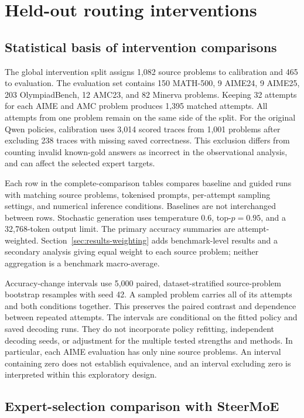\documentclass[12pt,a4paper,twoside,openright]{book}
\begin{document}
\section{Held-out routing interventions}
\label{sec:results-guiding}

\subsection{Statistical basis of intervention comparisons}

The global intervention split assigns 1,082 source problems to calibration
and 465 to evaluation. The evaluation set contains 150 MATH-500, 9 AIME24,
9 AIME25, 203 OlympiadBench, 12 AMC23, and 82 Minerva problems. Keeping
32 attempts for each AIME and AMC problem produces 1,395 matched attempts.
All attempts from one problem remain on the same side of the split.
For the original Qwen policies, calibration uses 3,014 scored traces from
1,001 problems after excluding 238 traces with missing saved correctness.
This exclusion differs from counting invalid known-gold answers as incorrect
in the observational analysis, and can affect the selected expert targets.

Each row in the complete-comparison tables compares baseline and guided runs with matching
source problems, tokenised prompts, per-attempt sampling settings, and
numerical inference conditions. Baselines are not
interchanged between rows. Stochastic generation uses temperature 0.6,
top-$p=0.95$, and a 32,768-token output limit. The primary accuracy
summaries are attempt-weighted. Section~\ref{sec:results-weighting} adds
benchmark-level results and a secondary analysis giving equal weight to
each source problem; neither aggregation is a benchmark macro-average.

Accuracy-change intervals use 5,000 paired, dataset-stratified source-problem
bootstrap resamples with seed 42. A sampled problem carries all of its
attempts and both conditions together. This preserves the paired contrast
and dependence between repeated attempts. The intervals are conditional on
the fitted policy and saved decoding runs. They do not incorporate policy
refitting, independent decoding seeds, or adjustment for the multiple tested
strengths and methods. In particular, each AIME evaluation has only nine
source problems. An interval containing zero does not establish equivalence,
and an interval excluding zero is interpreted within this exploratory design.

\subsection{Expert-selection comparison with SteerMoE}
\label{sec:expert-selection-audit}
\end{document}
